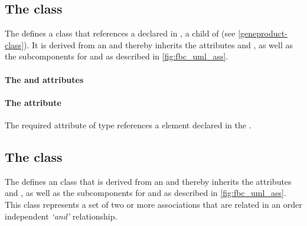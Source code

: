 \subsection{The \FBC {} class}
\label{geneproductref-class}

The \FBCPackage defines a \GeneProductRef class that references
a \GeneProduct declared in \ListOfGeneProducts, a child of
\Model (see \ref{geneproduct-class}). It is derived from an \Association and thereby inherits the \SBase attributes  and , as well as the subcomponents for \Annotation and \Notes as described in \ref{fig:fbc_uml_ass}.

\paragraph{The  and  attributes}


\paragraph{The  attribute}
The required  attribute of type %
references a \GeneProduct element declared in the \ListOfGeneProducts.
\pagebreak
\subsection{The \FBC {} class}
\label{and-class}

The \FBCPackage defines an \GeneAnd class that is derived from
an \Association and thereby inherits the \SBase attributes 
and , as well as the subcomponents for \Annotation and
\Notes as described in \ref{fig:fbc_uml_ass}. This class represents a
set of two or more associations that are related in an order independent
\emph{`and'} relationship.

